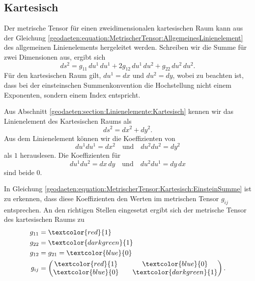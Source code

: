 %
%
%
%
\subsection{Kartesisch\label{geodaeten:section:MetrischerTensor:Kartesisch}}

Der metrische Tensor für einen zweidimensionalen kartesischen Raum kann aus der Gleichung \eqref{geodaeten:equation:MetrischerTensor:AllgemeinesLinienelement} des allgemeinen Linienelements hergeleitet werden.
Schreiben wir die Summe für zwei Dimensionen aus, ergibt sich
\begin{equation}
	ds^2 = g_{11} \, du^1 \, du^1 + 2g_{12} \, du^1 \, du^2 + g_{22} \, du^2 \, du^2.
	\label{geodaeten:equation:MetrischerTensor:Kartesisch:EinsteinSumme}
\end{equation}
Für den kartesischen Raum gilt, $du^1 = dx$ und $du^2 = dy$, wobei zu beachten ist, dass bei der einsteinschen Summenkonvention die Hochstellung nicht einem Exponenten, sondern einem Index entspricht.

Aus Abschnitt \ref{geodaeten:section:Linienelemente:Kartesisch} kennen wir das Linienelement des Kartesischen Raums als
\begin{equation}
	ds^2 = dx^2 + dy^2 .
\end{equation}
Aus dem Linienelement können wir die Koeffizienten von 
\begin{equation}
	du^1 du^1 = dx^2 \quad \text{und} \quad du^2  du^2 = dy^2 
\end{equation}
als $1$ herauslesen. 
Die Koeffizienten für
\begin{equation}
du^1  du^2 = dx \, dy \quad \text{und} \quad du^2  du^1 = dy \,  dx
\end{equation}
sind beide $0$.

In Gleichung \eqref{geodaeten:equation:MetrischerTensor:Kartesisch:EinsteinSumme} ist zu erkennen, dass diese Koeffizienten den Werten im metrischen Tensor $g_{ij}$ entsprechen.
An den richtigen Stellen eingesetzt ergibt sich der metrische Tensor des kartesischen Raums zu
\begin{equation}
	\begin{aligned}
		g_{11} &= \textcolor{red}{1} \\
		g_{22} &= \textcolor{darkgreen}{1} \\
		g_{12} &= g_{21} = \textcolor{blue}{0} \\
		g_{ij} &= \begin{pmatrix} \textcolor{red}{1} && \textcolor{blue}{0} \\ \textcolor{blue}{0} && \textcolor{darkgreen}{1} \end{pmatrix} .
	\end{aligned}
\end{equation}
